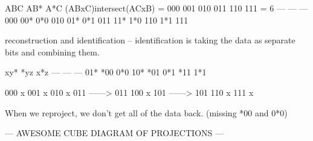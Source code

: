ABC  AB*  A*C  (ABxC)intersect(ACxB) = 000 001 010 011 110 111 = 6
---  ---  ---
000  00*  0*0
010  01*  0*1
011  11*  1*0
110       1*1
111

reconstruction and identification -- identification is taking the data as separate bits and combining them.


xy*   *yz   x*z
---   ---   ---
01*   *00   0*0
10*   *01   0*1
      *11   1*1


000 x
001 x
010 x
011 ------>  011
100 x
101 ------>  101
110 x
111 x

When we reproject, we don't get all of the data back.
(missing *00 and 0*0)

--- AWESOME CUBE DIAGRAM OF PROJECTIONS ---

